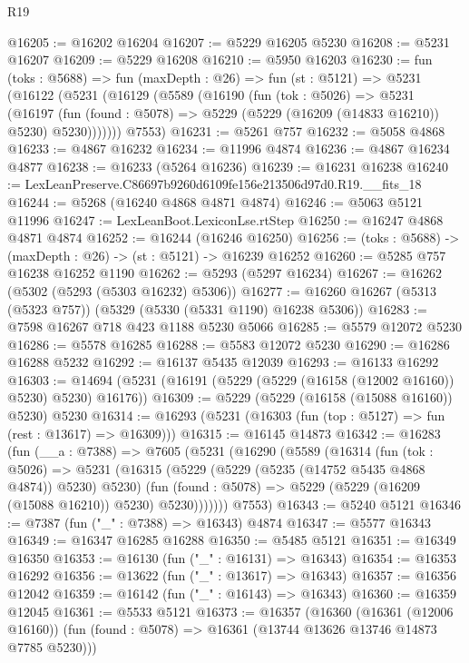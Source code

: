 \begin{lexlean}{R19}
\begin{coremodule}
@16205 := @16202 @16204
@16207 := @5229 @16205 @5230
@16208 := @5231 @16207
@16209 := @5229 @16208
@16210 := @5950 @16203
@16230 := fun (toks : @5688) =>
  fun (maxDepth : @26) =>
  fun (st : @5121) =>
  @5231
    (@16122
      (@5231
        (@16129
          (@5589
            (@16190
              (fun (tok : @5026) =>
              @5231
                (@16197
                  (fun (found : @5078) => @5229 (@5229 (@16209 (@14833 @16210)) @5230) @5230)))))))
      @7553)
@16231 := @5261 @757
@16232 := @5058 @4868
@16233 := @4867 @16232
@16234 := @11996 @4874
@16236 := @4867 @16234 @4877
@16238 := @16233 (@5264 @16236)
@16239 := @16231 @16238
@16240 := LexLeanPreserve.C86697b9260d6109fe156e213506d97d0.R19.__fits_18
@16244 := @5268 (@16240 @4868 @4871 @4874)
@16246 := @5063 @5121 @11996
@16247 := LexLeanBoot.LexiconLse.rtStep
@16250 := @16247 @4868 @4871 @4874
@16252 := @16244 (@16246 @16250)
@16256 := (toks : @5688) -> (maxDepth : @26) -> (st : @5121) -> @16239 @16252
@16260 := @5285 @757 @16238 @16252 @1190
@16262 := @5293 (@5297 @16234)
@16267 := @16262 (@5302 (@5293 (@5303 @16232) @5306))
@16277 := @16260 @16267 (@5313 (@5323 @757)) (@5329 (@5330 (@5331 @1190) @16238 @5306))
@16283 := @7598 @16267 @718 @423 @1188 @5230 @5066
@16285 := @5579 @12072 @5230
@16286 := @5578 @16285
@16288 := @5583 @12072 @5230
@16290 := @16286 @16288 @5232
@16292 := @16137 @5435 @12039
@16293 := @16133 @16292
@16303 := @14694 (@5231 (@16191 (@5229 (@5229 (@16158 (@12002 @16160)) @5230) @5230) @16176))
@16309 := @5229 (@5229 (@16158 (@15088 @16160)) @5230) @5230
@16314 := @16293 (@5231 (@16303 (fun (top : @5127) => fun (rest : @13617) => @16309)))
@16315 := @16145 @14873
@16342 := @16283
    (fun (__a : @7388) =>
    @7605
      (@5231
        (@16290
          (@5589
            (@16314
              (fun (tok : @5026) =>
              @5231
                (@16315
                  (@5229 (@5229 (@5235 (@14752 @5435 @4868 @4874)) @5230) @5230)
                  (fun (found : @5078) => @5229 (@5229 (@16209 (@15088 @16210)) @5230) @5230)))))))
      @7553)
@16343 := @5240 @5121
@16346 := @7387 (fun ("_" : @7388) => @16343) @4874
@16347 := @5577 @16343
@16349 := @16347 @16285 @16288
@16350 := @5485 @5121
@16351 := @16349 @16350
@16353 := @16130 (fun ("_" : @16131) => @16343)
@16354 := @16353 @16292
@16356 := @13622 (fun ("_" : @13617) => @16343)
@16357 := @16356 @12042
@16359 := @16142 (fun ("_" : @16143) => @16343)
@16360 := @16359 @12045
@16361 := @5533 @5121
@16373 := @16357
    (@16360
      (@16361 (@12006 @16160))
      (fun (found : @5078) => @16361 (@13744 @13626 @13746 @14873 @7785 @5230)))

\end{coremodule}
\end{lexlean}
